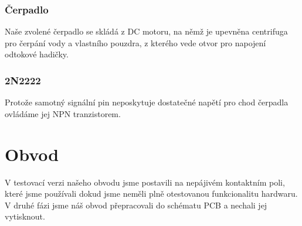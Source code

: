 \documentclass[11pt,a4paper]{article}
\begin{document}
\subsubsection*{Čerpadlo}

Naše zvolené čerpadlo se skládá z DC motoru, na němž je upevněna centrifuga pro čerpání vody a vlastního pouzdra, z kterého vede otvor pro napojení odtokové hadičky.

\subsubsection*{2N2222}

Protože samotný signální pin neposkytuje dostatečné napětí pro chod čerpadla ovládáme jej NPN tranzistorem.

\section*{Obvod}

V testovací verzi našeho obvodu jsme postavili na nepájivém kontaktním poli, které jsme používali dokud jsme neměli plně otestovanou funkcionalitu hardwaru. V druhé fázi jsme náš obvod přepracovali do schématu PCB a nechali jej vytisknout.
\end{document}
